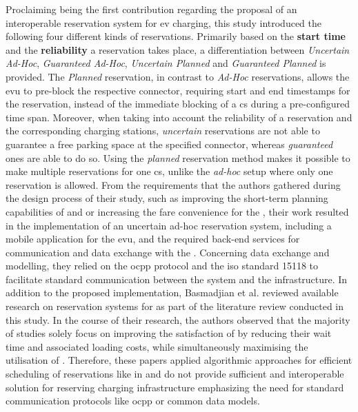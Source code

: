 Proclaiming being the first contribution regarding the proposal of an interoperable reservation system for \acrshort{ev} charging, this study introduced the following four different kinds of reservations. Primarily based on the \textbf{start time} and the \textbf{reliability} a reservation takes place, a differentiation between \textit{Uncertain Ad-Hoc}, \textit{Guaranteed Ad-Hoc}, \textit{Uncertain Planned} and \textit{Guaranteed Planned} is provided.
The \textit{Planned} reservation, in contrast to \textit{Ad-Hoc} reservations, allows the \acrshort{evu} to pre-block the respective connector, requiring start and end timestamps for the reservation, instead of the immediate blocking of a \acrshort{cs} during a pre-configured time span. 
Moreover, when taking into account the reliability of a reservation and the corresponding charging stations, \textit{uncertain} reservations are not able to guarantee a free parking space at the specified connector, whereas \textit{guaranteed} ones are able to do so.
Using the \textit{planned} reservation method makes it possible to make multiple reservations for one \acrshort{cs}, unlike the \textit{ad-hoc} setup where only one reservation is allowed.
From the requirements that the authors gathered during the design process of their study, such as improving the short-term planning capabilities of  and  or increasing the fare convenience for the , their work resulted in the implementation of an uncertain ad-hoc reservation system, including a mobile application for the \acrshort{evu}, and the required back-end services for communication and data exchange with the .
Concerning data exchange and modelling, they relied on the \acrshort{ocpp} protocol and the \acrshort{iso} standard 15118 to facilitate standard communication between the system and the infrastructure.
In addition to the proposed implementation, Basmadjian et al. reviewed available research on reservation systems for  as part of the literature review conducted in this study.
In the course of their research, the authors observed that the majority of studies solely focus on improving the satisfaction of  by reducing their wait time and associated loading costs, while simultaneously maximising the utilisation of .
Therefore, these papers applied algorithmic approaches for efficient scheduling of reservations like in \cite{kim_efficient_2010,xiang_reservation-based_2011,qin_charging_2011} and do not provide sufficient and interoperable solution for reserving charging infrastructure emphasizing the need for standard communication protocols like \acrshort{ocpp} or common data models. 
